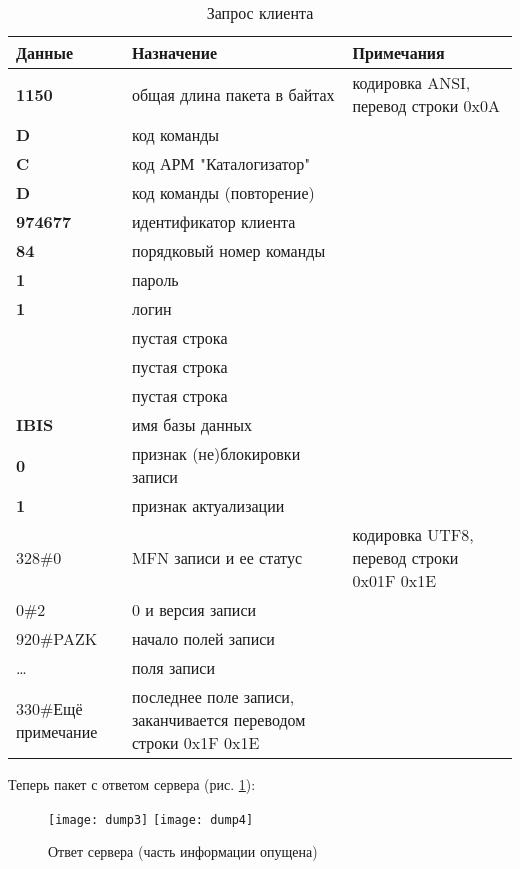 \begin{table}[htbp]
	\centering
	\caption{Запрос клиента}
	\begin{tabular}{ | p{} | p{} | p{} | }
		\hline
		\textbf{Данные} & 
		\textbf{Назначение} &
		\textbf{Примечания}
		\\ \hline
		\hline
		\textbf{1150} &
		общая длина пакета в байтах &
		кодировка ANSI, перевод строки 0x0A		
		\\ \hline
		\textbf{D} &
		код команды &
		\\ \hline
		\textbf{C} &
		код АРМ "Каталогизатор" &
		\\ \hline
		\textbf{D} &
		код команды (повторение) &
		\\ \hline
		\textbf{974677} &
		идентификатор клиента &
		\\ \hline
		\textbf{84} &
		порядковый номер команды &
		\\ \hline
		\textbf{1} &
		пароль &
		\\ \hline
		\textbf{1} &
		логин &
		\\ \hline
		& пустая строка &
		\\ \hline
		& пустая строка &
		\\ \hline
		& пустая строка &
		\\ \hline
		\textbf{IBIS} &
		имя базы данных &
		\\ \hline
		\textbf{0} &
		признак (не)блокировки записи &
		\\ \hline
		\textbf{1} &
		признак актуализации &
		\\ \hline
		328\#0 &
		MFN записи и ее статус &
		кодировка UTF8, перевод строки 0x01F 0x1E
		\\ \hline
		0\#2 &
		0 и версия записи &
		\\ \hline
		920\#PAZK &
		начало полей записи &
		\\ \hline
		\dots &
		поля записи &
		\\ \hline
		330\#Ещё примечание &
		последнее поле записи, заканчивается переводом строки 0x1F 0x1E &
		\\ \hline
	\end{tabular}
\end{table}

Теперь пакет с ответом сервера (рис. \ref{dump3}):

\begin{figure}[h]	
	\centering
	\texttt{[image: dump3]}
	\texttt{[image: dump4]}
	\caption{Ответ сервера (часть информации опущена)} \label{dump3}
\end{figure}
